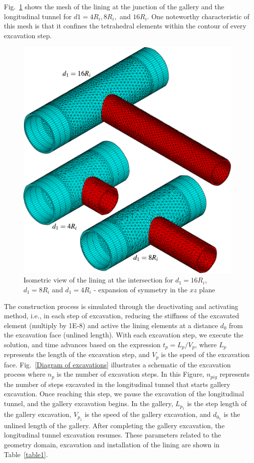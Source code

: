 \documentclass[a4paper,fleqn]{cas-sc}
\begin{document}
\FloatBarrier
Fig.~\ref{Mesh6} shows the mesh of the lining at the junction of the gallery and the longitudinal tunnel for $d1 = 4R_i, 8R_i,$ and $16R_i$. One noteworthy characteristic of this mesh is that it confines the tetrahedral elements within the contour of every excavation step.
\begin{figure}[h!]
	\centering
	\includegraphics[scale=0.6]{Mesh6.pdf}
	\caption{Isometric view of the lining at the intersection for $d_1=16R_i$, $d_1=8R_i$ and $d_1=4R_i$ - expansion of symmetry in the $xz$ plane}
	\label{Mesh6}
\end{figure}
\FloatBarrier
The construction process is simulated through the deactivating and activating method, i.e., in each step of excavation, reducing the stiffness of the excavated element (multiply  by 1E-8) and active the lining elements at a distance $d_0$ from the excavation face (unlined length). With each excavation step, we execute the solution, and time advances based on the expression $t_p=L_p/V_p$, where $L_p$ represents the length of the excavation step, and $V_p$ is the speed of the excavation face. Fig.~\ref{Diagram of excavations} illustrates a schematic of the excavation process where $n_p$ is the number of excavation steps. In this Figure, $n_{pig}$ represents the number of steps excavated in the longitudinal tunnel that starts gallery excavation. Once reaching this step, we pause the excavation of the longitudinal tunnel, and the gallery excavation begins. In the gallery, $L_{p_1}$ is the step length of the gallery excavation, $V_{p_1}$ is the speed of the gallery excavation, and $d_{0_1}$ is the unlined length of the gallery. After completing the gallery excavation, the longitudinal tunnel excavation resumes. These parameters related to the geometry domain, excavation and installation of the lining are shown in Table~\ref{table1}.
\end{document}
